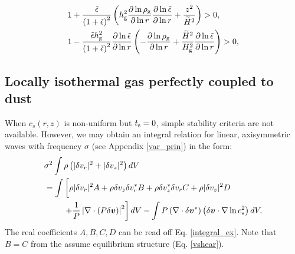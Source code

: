 


\begin{align} 
  &1 + \frac{\tilde{\epsilon}}{\left(1+
    \tilde{\epsilon}\right)^2}\left(h_\mathrm{g}^2\frac{\partial\ln{\rho_\mathrm{g}}}{\partial\ln{r}}
  \frac{\partial\ln{\tilde{\epsilon}}}{\partial\ln{r}} + 
  \frac{z^2}{\widetilde{H}^2}\right)>0,   \\ 
&1 - \frac{\tilde{\epsilon}
  h_\mathrm{g}^2}{\left(1+\tilde{\epsilon}\right)^2}
  \frac{\partial\ln{\tilde{\epsilon}}}{\partial\ln{r}}\left(-\frac{\partial\ln{\rho_\mathrm{g}}}{\partial\ln{r}}+\frac{\widetilde{H}^2}{H_\mathrm{g}^2}\frac{\partial\ln{\tilde{\epsilon}}}{\partial\ln{r}}\right) > 0,
\end{align}






\subsection{Locally isothermal gas perfectly coupled to dust} 
When $c_s(r,z)$ is non-uniform but $t_\mathrm{s}=0$, simple stability
criteria are not available. However, we may obtain an integral
relation for linear, axisymmetric waves with frequency $\sigma$ (see
Appendix \ref{var_prin}) in the form:  
\begin{align}
&  \sigma^2\int\rho\left(|\dd v_r|^2 + |\dd v_z|^2\right)dV \notag\\
&= \int\left[ \rho
  |\dd v_r|^2A + \rho  \dd v_z \dd v_r^* B + \rho \dd v_z^*\dd v_r C +
  \rho |\dd v_z|^2 D\phantom{\frac{1}{1}}\right. \notag\\
&\phantom{===}  \left. + \frac{1}{P}\left|\nabla\cdot\left(P\dd
  \bm{v}\right)\right|^2\right]dV - \int P
  \left(\nabla\cdot\dd\bm{v}^*\right)\left(\dd\bm{v}\cdot\nabla\ln{c_s^2}\right)dV.
\end{align}
The real coefficients $A,B,C,D$ can be read off
Eq. \ref{integral_ex}. Note that $B=C$ from the assume equilibrium
structure (Eq. \ref{vshear}).  


